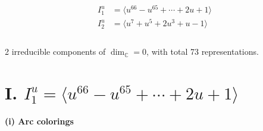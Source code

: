 \documentclass[1p]{elsarticle_modified}
\theoremstyle{definition}
\begin{document}
\begin{align*}
I^u_{1}&=\langle 
u^{66}- u^{65}+\cdots+2 u+1\rangle \\
I^u_{2}&=\langle 
u^7+u^5+2 u^3+u-1\rangle \\
\\
\end{align*}
\raggedright * 2 irreducible components of $\dim_{\mathbb{C}}=0$, with total 73 representations.\\
\newpage
\renewcommand{\arraystretch}{1}
\centering \section*{I. $I^u_{1}= \langle u^{66}- u^{65}+\cdots+2 u+1 \rangle$}
\flushleft \textbf{(i) Arc colorings}\\
\end{document}
